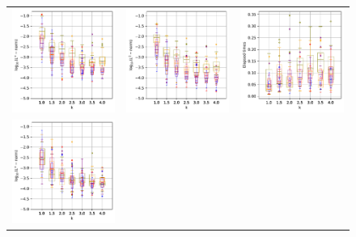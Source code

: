 \documentclass[12pt]{report} %
\begin{document}
\begin{figure}[h]
  \hspace*{-3cm}
  \begin{tabular}{ccc}
    \includegraphics[width=.42\textwidth]{imagenes/experiments/1d/statistical_1d_full_scheduler_interpolation/boxplot_linf_u2_Poly-1.pdf} &
  \includegraphics[width=.42\textwidth]{imagenes/experiments/1d/statistical_1d_full_scheduler_interpolation/boxplot_l2_u2_Poly-1.pdf} &
  \includegraphics[width=.42\textwidth]{imagenes/experiments/1d/statistical_1d_full_scheduler_interpolation/boxplot_times_u2_Poly-1.pdf} \\
  \includegraphics[width=.42\textwidth]{imagenes/experiments/1d/statistical_1d_full_scheduler_interpolation/boxplot_linf_u2_Poly2.pdf} &

\end{tabular}
\end{figure}
\end{document}
